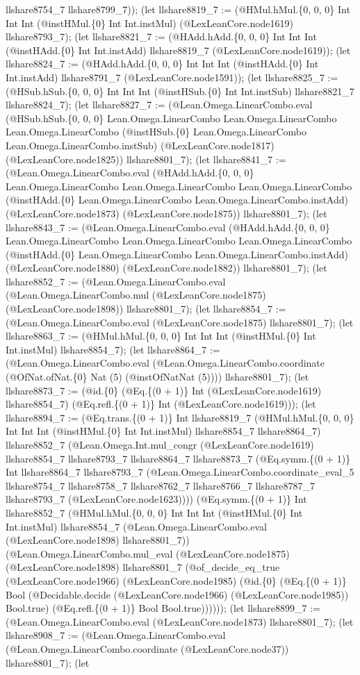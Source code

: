 \documentclass[11pt]{article}
\begin{document}
llshare8754\_7 llshare8799\_7)); (let llshare8819\_7 := (@HMul.hMul.\{0, 0, 0\} Int Int Int (@instHMul.\{0\} Int Int.instMul) (@LexLeanCore.node1619) llshare8793\_7); (let llshare8821\_7 := (@HAdd.hAdd.\{0, 0, 0\} Int Int Int (@instHAdd.\{0\} Int Int.instAdd) llshare8819\_7 (@LexLeanCore.node1619)); (let llshare8824\_7 := (@HAdd.hAdd.\{0, 0, 0\} Int Int Int (@instHAdd.\{0\} Int Int.instAdd) llshare8791\_7 (@LexLeanCore.node1591)); (let llshare8825\_7 := (@HSub.hSub.\{0, 0, 0\} Int Int Int (@instHSub.\{0\} Int Int.instSub) llshare8821\_7 llshare8824\_7); (let llshare8827\_7 := (@Lean.Omega.LinearCombo.eval (@HSub.hSub.\{0, 0, 0\} Lean.Omega.LinearCombo Lean.Omega.LinearCombo Lean.Omega.LinearCombo (@instHSub.\{0\} Lean.Omega.LinearCombo Lean.Omega.LinearCombo.instSub) (@LexLeanCore.node1817) (@LexLeanCore.node1825)) llshare8801\_7); (let llshare8841\_7 := (@Lean.Omega.LinearCombo.eval (@HAdd.hAdd.\{0, 0, 0\} Lean.Omega.LinearCombo Lean.Omega.LinearCombo Lean.Omega.LinearCombo (@instHAdd.\{0\} Lean.Omega.LinearCombo Lean.Omega.LinearCombo.instAdd) (@LexLeanCore.node1873) (@LexLeanCore.node1875)) llshare8801\_7); (let llshare8843\_7 := (@Lean.Omega.LinearCombo.eval (@HAdd.hAdd.\{0, 0, 0\} Lean.Omega.LinearCombo Lean.Omega.LinearCombo Lean.Omega.LinearCombo (@instHAdd.\{0\} Lean.Omega.LinearCombo Lean.Omega.LinearCombo.instAdd) (@LexLeanCore.node1880) (@LexLeanCore.node1882)) llshare8801\_7); (let llshare8852\_7 := (@Lean.Omega.LinearCombo.eval (@Lean.Omega.LinearCombo.mul (@LexLeanCore.node1875) (@LexLeanCore.node1898)) llshare8801\_7); (let llshare8854\_7 := (@Lean.Omega.LinearCombo.eval (@LexLeanCore.node1875) llshare8801\_7); (let llshare8863\_7 := (@HMul.hMul.\{0, 0, 0\} Int Int Int (@instHMul.\{0\} Int Int.instMul) llshare8854\_7); (let llshare8864\_7 := (@Lean.Omega.LinearCombo.eval (@Lean.Omega.LinearCombo.coordinate (@OfNat.ofNat.\{0\} Nat (5) (@instOfNatNat (5)))) llshare8801\_7); (let llshare8873\_7 := (@id.\{0\} (@Eq.\{(0 + 1)\} Int (@LexLeanCore.node1619) llshare8854\_7) (@Eq.refl.\{(0 + 1)\} Int (@LexLeanCore.node1619))); (let llshare8894\_7 := (@Eq.trans.\{(0 + 1)\} Int llshare8819\_7 (@HMul.hMul.\{0, 0, 0\} Int Int Int (@instHMul.\{0\} Int Int.instMul) llshare8854\_7 llshare8864\_7) llshare8852\_7 (@Lean.Omega.Int.mul\_congr (@LexLeanCore.node1619) llshare8854\_7 llshare8793\_7 llshare8864\_7 llshare8873\_7 (@Eq.symm.\{(0 + 1)\} Int llshare8864\_7 llshare8793\_7 (@Lean.Omega.LinearCombo.coordinate\_eval\_5 llshare8754\_7 llshare8758\_7 llshare8762\_7 llshare8766\_7 llshare8787\_7 llshare8793\_7 (@LexLeanCore.node1623)))) (@Eq.symm.\{(0 + 1)\} Int llshare8852\_7 (@HMul.hMul.\{0, 0, 0\} Int Int Int (@instHMul.\{0\} Int Int.instMul) llshare8854\_7 (@Lean.Omega.LinearCombo.eval (@LexLeanCore.node1898) llshare8801\_7)) (@Lean.Omega.LinearCombo.mul\_eval (@LexLeanCore.node1875) (@LexLeanCore.node1898) llshare8801\_7 (@of\_decide\_eq\_true (@LexLeanCore.node1966) (@LexLeanCore.node1985) (@id.\{0\} (@Eq.\{(0 + 1)\} Bool (@Decidable.decide (@LexLeanCore.node1966) (@LexLeanCore.node1985)) Bool.true) (@Eq.refl.\{(0 + 1)\} Bool Bool.true)))))); (let llshare8899\_7 := (@Lean.Omega.LinearCombo.eval (@LexLeanCore.node1873) llshare8801\_7); (let llshare8908\_7 := (@Lean.Omega.LinearCombo.eval (@Lean.Omega.LinearCombo.coordinate (@LexLeanCore.node37)) llshare8801\_7); (let 
\end{document}
